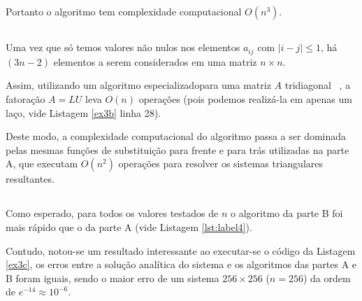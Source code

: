 \documentclass[12pt,a4paper,final]{article}
\begin{document}
Portanto o algoritmo tem complexidade computacional $ O(n^3) $.

\subsection{}
Uma vez que só temos valores não nulos nos elementos $ a_{ij} $ com $ |i − j| \leq 1 $,
há $ (3n - 2) $ elementos a serem considerados em uma matriz $ n \times n $.

Assim, utilizando um algoritmo especializadopara uma matriz $ A $
tridiagonal~\cite{barannyk} , a fatoração $ A=LU $ leva $ O(n) $ operações (pois 
podemos realizá-la em apenas um laço, vide Listagem \ref{ex3b} linha 28).

Deste modo, a complexidade computacional do algoritmo passa a ser dominada pelas mesmas 
funções de substituição para frente e para trás utilizadas na parte A, que 
executam $ O(n^2) $ operações para resolver os sistemas triangulares resultantes.

\subsection{}
Como esperado, para todos os valores testados de $ n $ o algoritmo da parte B foi mais rápido que o da parte A (vide Listagem \ref{lst:label4}).

Contudo, notou-se um resultado interessante ao executar-se o código da Listagem \ref{ex3c},
os erros entre a solução analítica do sistema e os algoritmos das partes A e B foram 
iguais, sendo o maior erro de um sistema $ 256 \times 256 $ ($ n = 256 $) da ordem de 
$ e^{-14} \approx 10^{-6} $.
\end{document}
